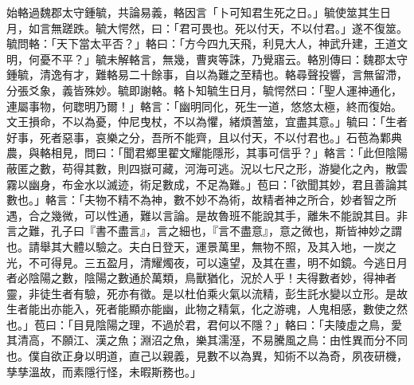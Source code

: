 \begin{pinyinscope}
始輅過魏郡太守鍾毓，共論易義，輅因言「卜可知君生死之日。」毓使筮其生日月，如言無蹉跌。毓大愕然，曰：「君可畏也。死以付天，不以付君。」遂不復筮。毓問輅：「天下當太平否？」輅曰：「方今四九天飛，利見大人，神武升建，王道文明，何憂不平？」毓未解輅言，無幾，曹爽等誅，乃覺寤云。輅別傳曰：魏郡太守鍾毓，清逸有才，難輅易二十餘事，自以為難之至精也。輅尋聲投響，言無留滯，分張爻象，義皆殊妙。毓即謝輅。輅卜知毓生日月，毓愕然曰：「聖人運神通化，連屬事物，何聦明乃爾！」輅言：「幽明同化，死生一道，悠悠太極，終而復始。文王損命，不以為憂，仲尼曳杖，不以為懼，緒煩蓍筮，宜盡其意。」毓曰：「生者好事，死者惡事，哀樂之分，吾所不能齊，且以付天，不以付君也。」石苞為鄴典農，與輅相見，問曰：「聞君鄉里翟文耀能隱形，其事可信乎？」輅言：「此但陰陽蔽匿之數，苟得其數，則四嶽可藏，河海可逃。況以七尺之形，游變化之內，散雲霧以幽身，布金水以滅迹，術足數成，不足為難。」苞曰：「欲聞其妙，君且善論其數也。」輅言：「夫物不精不為神，數不妙不為術，故精者神之所合，妙者智之所遇，合之幾微，可以性通，難以言論。是故魯班不能說其手，離朱不能說其目。非言之難，孔子曰『書不盡言』，言之細也，『言不盡意』，意之微也，斯皆神妙之謂也。請舉其大體以驗之。夫白日登天，運景萬里，無物不照，及其入地，一炭之光，不可得見。三五盈月，清耀燭夜，可以遠望，及其在晝，明不如鏡。今逃日月者必陰陽之數，陰陽之數通於萬類，鳥獸猶化，況於人乎！夫得數者妙，得神者靈，非徒生者有驗，死亦有徵。是以杜伯乘火氣以流精，彭生託水變以立形。是故生者能出亦能入，死者能顯亦能幽，此物之精氣，化之游魂，人鬼相感，數使之然也。」苞曰：「目見陰陽之理，不過於君，君何以不隱？」輅曰：「夫陵虛之鳥，愛其清高，不願江、漢之魚；淵沼之魚，樂其濡溼，不易騰風之鳥：由性異而分不同也。僕自欲正身以明道，直己以親義，見數不以為異，知術不以為奇，夙夜研機，孳孳溫故，而素隱行怪，未暇斯務也。」


\end{pinyinscope}
